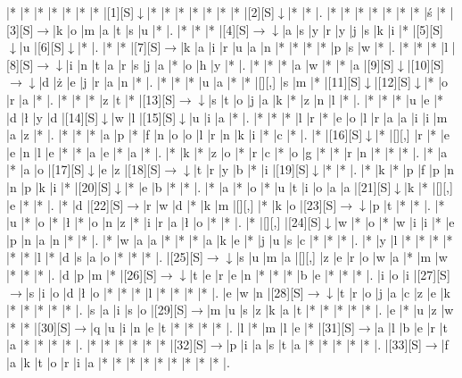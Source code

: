 \documentclass[11pt]{article}
\newcommand\drarr{$\rightarrow \!\!\!\!\! \downarrow$}
\newcommand\rarr{$\rightarrow$}
\newcommand\darr{$\downarrow$}
\begin{document}
\noindent\begin{Puzzle}{17}{29}|*	|*	|*	|*	|*	|*	|*	|[1][S]\darr	|*	|*	|*	|*	|*	|*	|*	|[2][S]\darr	|*	|*	|.
|*	|*	|*	|*	|*	|*	|*	|ś	|*	|[3][S]\rarr	|k	|o	|m	|a	|t	|s	|u	|*	|.
|*	|*	|*	|[4][S]\drarr	|a	|s	|y	|r	|y	|j	|s	|k	|i	|*	|[5][S]\darr	|u	|[6][S]\darr	|*	|.
|*	|*	|[7][S]\rarr	|k	|a	|i	|r	|u	|a	|n	|*	|*	|*	|*	|p	|s	|w	|*	|.
|*	|*	|*	|l	|[8][S]\drarr	|i	|n	|t	|a	|r	|s	|j	|a	|*	|o	|h	|y	|*	|.
|*	|*	|*	|a	|w	|*	|*	|a	|[9][S]\darr	|[10][S]\drarr	|d	|ż	|e	|j	|r	|a	|n	|*	|.
|*	|*	|*	|u	|a	|*	|*	|[][,]{ }	|s	|m	|*	|[11][S]\darr	|[12][S]\darr	|*	|o	|r	|a	|*	|.
|*	|*	|*	|z	|t	|*	|[13][S]\drarr	|s	|t	|o	|j	|a	|k	|*	|z	|n	|l	|*	|.
|*	|*	|*	|u	|e	|*	|d	|ł	|y	|d	|[14][S]\darr	|w	|l	|[15][S]\darr	|u	|i	|a	|*	|.
|*	|*	|*	|l	|r	|*	|e	|o	|l	|r	|a	|a	|i	|i	|m	|a	|z	|*	|.
|*	|*	|*	|a	|p	|*	|f	|n	|o	|o	|l	|r	|n	|k	|i	|*	|c	|*	|.
|*	|[16][S]\darr	|*	|[][,]{ }	|r	|*	|e	|e	|n	|l	|e	|*	|*	|a	|e	|*	|a	|*	|.
|*	|k	|*	|z	|o	|*	|r	|c	|*	|o	|g	|*	|*	|r	|n	|*	|*	|*	|.
|*	|a	|*	|a	|o	|[17][S]\darr	|e	|z	|[18][S]\drarr	|t	|r	|y	|b	|*	|i	|[19][S]\darr	|*	|*	|.
|*	|k	|*	|p	|f	|p	|n	|n	|p	|k	|i	|*	|[20][S]\darr	|*	|e	|b	|*	|*	|.
|*	|a	|*	|o	|*	|u	|t	|i	|o	|a	|a	|[21][S]\darr	|k	|*	|[][,]{ }	|e	|*	|*	|.
|*	|d	|[22][S]\rarr	|r	|w	|d	|*	|k	|m	|[][,]{ }	|*	|k	|o	|[23][S]\drarr	|p	|t	|*	|*	|.
|*	|u	|*	|o	|*	|ł	|*	|o	|n	|z	|*	|i	|r	|a	|ł	|o	|*	|*	|.
|*	|[][,]{ }	|[24][S]\darr	|w	|*	|o	|*	|w	|i	|i	|*	|e	|p	|n	|a	|n	|*	|*	|.
|*	|w	|a	|a	|*	|*	|*	|a	|k	|e	|*	|j	|u	|s	|c	|*	|*	|*	|.
|*	|y	|l	|*	|*	|*	|*	|*	|*	|l	|*	|d	|s	|a	|o	|*	|*	|*	|.
|[25][S]\drarr	|s	|u	|m	|a	|[][,]{ }	|z	|e	|r	|o	|w	|a	|*	|m	|w	|*	|*	|*	|.
|d	|p	|m	|*	|[26][S]\drarr	|t	|e	|r	|e	|n	|*	|*	|*	|b	|e	|*	|*	|*	|.
|i	|o	|i	|[27][S]\rarr	|s	|i	|o	|d	|ł	|o	|*	|*	|*	|l	|*	|*	|*	|*	|.
|e	|w	|n	|[28][S]\drarr	|t	|r	|o	|j	|a	|c	|z	|e	|k	|*	|*	|*	|*	|*	|.
|s	|a	|i	|s	|o	|[29][S]\rarr	|m	|u	|s	|z	|k	|a	|t	|*	|*	|*	|*	|*	|.
|e	|*	|u	|z	|w	|*	|*	|[30][S]\rarr	|q	|u	|i	|n	|e	|t	|*	|*	|*	|*	|.
|l	|*	|m	|l	|e	|*	|[31][S]\rarr	|a	|l	|b	|e	|r	|t	|a	|*	|*	|*	|*	|.
|*	|*	|*	|*	|*	|*	|[32][S]\rarr	|p	|i	|a	|s	|t	|a	|*	|*	|*	|*	|*	|.
|[33][S]\rarr	|f	|a	|k	|t	|o	|r	|i	|a	|*	|*	|*	|*	|*	|*	|*	|*	|*	|.\end{Puzzle}

\newpage
\end{document}
